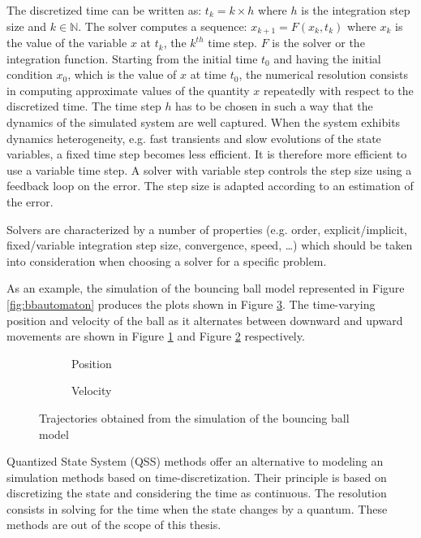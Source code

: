 The discretized time can be written as: $t_k = k \times h$ where $h$ is the integration step size and $k \in \mathbb{N}$. The solver computes a sequence: $x_{k+1} = F(x_k,t_k)$ where $x_k$ is the value of the variable $x$ at $t_k$, the $k^{th}$ time step. $F$ is the solver or the integration function. Starting from the initial time $t_0$ and having the initial condition $x_0$, which is the value of $x$ at time $t_0$, the numerical resolution consists in computing approximate values of the quantity $x$ repeatedly with respect to the discretized time. The time step $h$ has to be chosen in such a way that the dynamics of the simulated system are well captured. When the system exhibits dynamics heterogeneity, e.g. fast transients and slow evolutions of the state variables, a fixed time step becomes less efficient. It is therefore  more efficient to use a variable time step. A solver with variable step controls the step size using a feedback loop on the error. The step size is adapted according to an estimation of the error. 

Solvers are characterized by a number of properties (e.g. order, explicit/implicit, fixed/variable integration step size, convergence, speed, \ldots) which should be taken into consideration when choosing a solver for a specific problem. %

As an example, the simulation of the bouncing ball model represented in Figure \ref{fig:bbautomaton} produces the plots shown in Figure \ref{fig:bbsim}. The time-varying position and velocity of the ball as it alternates between downward and upward movements are shown in Figure \ref{fig:bbpos} and Figure \ref{fig:bbve} respectively.

\begin{figure}[phtb]
\centering
\begin{subfigure}{\textwidth}
  \centering
  
  \caption{Position}
  \label{fig:bbpos}
\end{subfigure}

\begin{subfigure}{\textwidth}
  \centering
  
  \caption{Velocity}
  \label{fig:bbve}
\end{subfigure}
\caption{Trajectories obtained from the simulation of the bouncing ball model}
\label{fig:bbsim}
\end{figure}

Quantized State System (QSS) methods \cite{kofman:2001} offer an alternative to modeling an simulation methods based on time-discretization. Their principle is based on discretizing the state and considering the time as continuous. The resolution consists in solving for the time when the state changes by a quantum. These methods are out of the scope of this thesis. %

